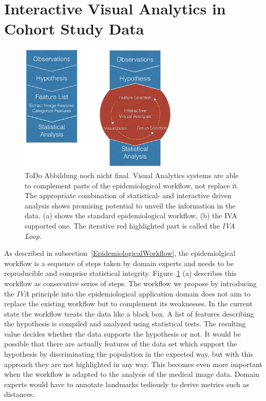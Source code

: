 \documentclass[journal]{style/vgtc} 			          %
\begin{document}
\section{Interactive Visual Analytics in Cohort Study Data}
\begin{figure}[htb]
 \centering
 \label{fig:WorkflowComparison}
 \includegraphics[width=3.0in]{figures/workflow_comparison}
 \caption{ToDo Abbildung noch nicht final. Visual Analytics systems are able to complement parts of the epidemiological workflow, not replace it. The appropriate combination of statistical- and interactive driven analysis shows promising potential to unveil the information in the data. (a) shows the standard epidemiological workflow, (b) the IVA supported one. The iterative red highlighted part is called the \emph{IVA Loop}.}
\end{figure}
%
As described in subsection~\ref{EpidemiologicalWorkflow}, the epidemiolgical workflow is a sequence of steps taken by domain experts and needs to be reproducible and comprise statistical integrity.
%
Figure~\ref{fig:WorkflowComparison} (a) describes this workflow as consecutive series of steps.
%
The workflow we propose by introducing the \emph{IVA} principle into the epidemiological application domain does not aim to replace the existing workflow but to complement its weaknesses.
%
In the current state the workflow treats the data like a black box.
%
A list of features describing the hypothesis is compiled and analyzed using statistical tests. 
%
The resulting value decides whether the data supports the hypothesis or not.
%
It would be possible that there are actually features of the data set which support the hypothesis by discriminating the population in the expected way, but with this approach they are not highlighted in any way.
%
This becomes even more important when the workflow is adapted to the analysis of the medical image data.
%
Domain experts would have to annotate landmarks tediously to derive metrics such as distances. %
\end{document}
